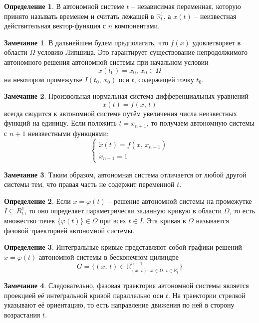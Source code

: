 \documentclass[a4paper,12pt]{article}
\renewcommand{\phi}{\ensuremath{\varphi}}
\theoremstyle{plain}
\theoremstyle{definition}
\newtheorem{definition}{Определение}[section]
\newtheorem*{note}{Замечание}
\theoremstyle{remark}
\begin{document}
\begin{definition}
	В автономной системе $t$ -- независимая переменная, которую принято называть временем и считать лежащей в $\mathbb{R}_t^1$, а $x(t)$ -- неизвестная действительная вектор-функция с $n$ компонентами.
\end{definition}

\begin{note}
	В дальнейшем будем предполагать, что $f(x)$ удовлетворяет в области $\Omega$ условию Липшица. Это гарантирует существование непродолжимого автономного решения автономной системы при начальном условии
	\[x(t_0) = x_0,\, x_0 \in \Omega\]
	на некотором промежутке $I(t_0,\,x_0)$ оси $t$, содержащей точку $t_0$.
\end{note}

\begin{note}
	Произвольная нормальная система дифференциальных уравнений
	\[\dot{x}(t) = f(x,\,t)\]
	всегда сводится к автономной системе путём увеличения числа неизвестных функций на единицу. Если положить $t = x_{n+1}$, то получаем автономную системы с $n+1$ неизвестными функциями:
	\[\begin{cases}
			\dot{x}(t) = f(x,\,x_{n+1}) \\
			\dot{x}_{n+1} = 1
		\end{cases}\]
\end{note}

\begin{note}
	Таким образом, автономная система отличается от любой другой системы тем, что правая часть не содержит переменной $t$.
\end{note}

\begin{definition}
	Если $x = \phi(t)$ -- решение автономной системы на промежутке $I \subseteq R_t^1$, то оно определяет параметрически заданную кривую в области $\Omega$, то есть множество точек $\{\phi(t)\} \in \Omega$ при всех $t \in I$. Эта кривая в $\Omega$ называется фазовой траекторией автономной системы.
\end{definition}

\begin{definition}
	Интегральные кривые представляют собой графики решений $x = \phi(t)$ автономной системы в бесконечном цилиндре
	\[G = \{(x,\,t) \in \mathbb{R}^{n+1}_{(x,\,t):\: x \in \Omega,\, t \in \mathbb{R}^1_t}\}\]
\end{definition}

\begin{note}
	Следовательно, фазовая траектория автономной системы является проекцией её интегральной кривой параллельно оси $t$. На траектории стрелкой указывают её ориентацию, то есть направление движения по ней в сторону возрастания $t$.
\end{note}
\end{document}

